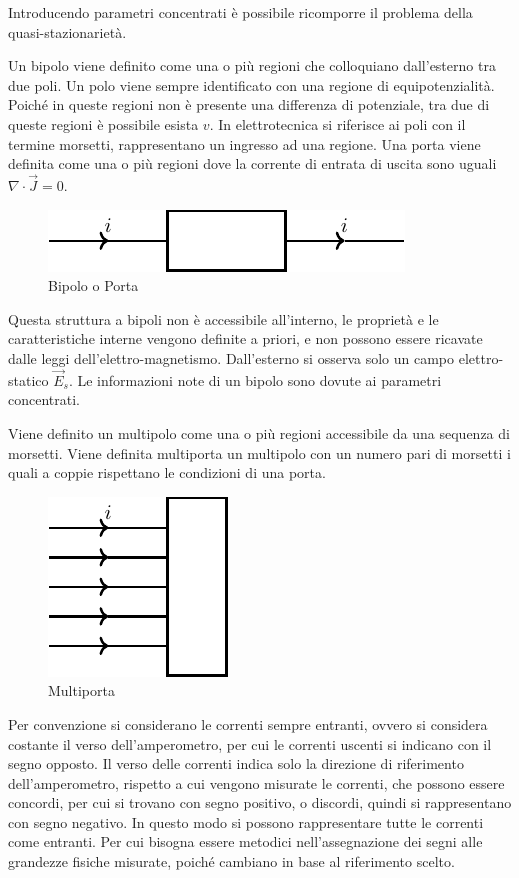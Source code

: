 \documentclass{article}
\numberwithin{equation}{subsection}
\begin{document}
Introducendo parametri concentrati è possibile ricomporre il problema della quasi-stazionarietà. 

Un bipolo viene definito come una o più regioni che colloquiano dall'esterno tra due poli. Un polo viene sempre identificato con una regione di equipotenzialità. Poiché in 
queste regioni non è presente una differenza di potenziale, tra due di queste regioni è possibile esista $v$. In elettrotecnica si riferisce ai poli con il termine morsetti, 
rappresentano un ingresso ad una regione. Una porta viene definita come una o più regioni dove la corrente di entrata di uscita sono uguali $\nabla\cdot\vec{J}=0$.

\begin{figure}[H]%
    \centering
    \includegraphics{bipolo.pdf}
    \caption{Bipolo o Porta}
    \label{fig:bipolo-porta}
\end{figure}
Questa struttura a bipoli non è accessibile all'interno, le proprietà e le caratteristiche interne vengono definite a priori, e non possono essere ricavate dalle leggi 
dell'elettro-magnetismo. Dall'esterno si osserva solo un campo elettro-statico $\vec{E}_s$. Le informazioni note di un bipolo sono dovute ai parametri concentrati. 

Viene definito un multipolo come una o più regioni accessibile da una sequenza di morsetti. Viene definita multiporta un multipolo con un numero pari di morsetti i quali 
a coppie rispettano le condizioni di una porta. 

\begin{figure}[H]%
    \centering
    \includegraphics{multiporta.pdf}
    \caption{Multiporta}
    \label{fig:multiporta}
\end{figure}

Per convenzione si considerano le correnti sempre entranti, ovvero si considera costante il verso dell'amperometro, per cui le correnti uscenti si indicano con il segno 
opposto. Il verso delle correnti indica solo la direzione di riferimento dell'amperometro, rispetto a cui vengono misurate le correnti, che possono essere concordi, per cui 
si trovano con segno positivo, o discordi, quindi si rappresentano con segno negativo. In questo modo si possono rappresentare tutte le correnti come entranti. Per cui bisogna 
essere metodici nell'assegnazione dei segni alle grandezze fisiche misurate, poiché cambiano in base al riferimento scelto. 
\end{document}
